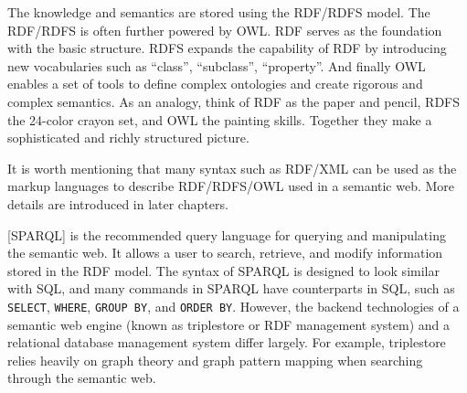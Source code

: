 The knowledge and semantics are stored using the RDF/RDFS model. The RDF/RDFS is often further powered by OWL. RDF serves as the foundation with the basic structure. RDFS expands the capability of RDF by introducing new vocabularies such as ``class'', ``subclass'', ``property''. And finally OWL enables a set of tools to define complex ontologies and create rigorous and complex semantics. As an analogy, think of RDF as the paper and pencil, RDFS the 24-color crayon set, and OWL the painting skills. Together they make a sophisticated and richly structured picture.

It is worth mentioning that many syntax such as RDF/XML can be used as the markup languages to describe RDF/RDFS/OWL used in a semantic web. More details are introduced in later chapters.

[SPARQL] is the recommended query language for querying and manipulating the semantic web. It allows a user to search, retrieve, and modify information stored in the RDF model. The syntax of SPARQL is designed to look similar with SQL, and many commands in SPARQL have counterparts in SQL, such as \verb|SELECT|, \verb|WHERE|, \verb|GROUP BY|, and \verb|ORDER BY|. However, the backend technologies of a semantic web engine (known as triplestore or RDF management system) and a relational database management system differ largely. For example, triplestore relies heavily on graph theory and graph pattern mapping when searching through the semantic web.

